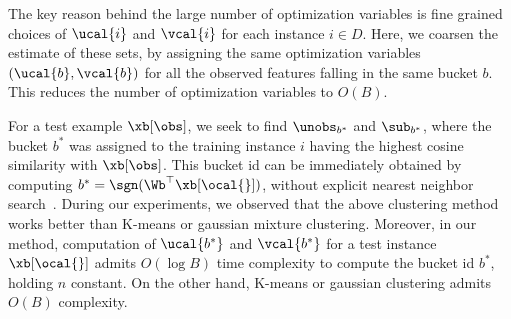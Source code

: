 \documentclass[letterpaper]{article}
\renewcommand{\cite}{\citep}
\begin{document}
The key reason behind the large number of optimization variables is   fine grained choices of $\ucal{i}$ and $\vcal{i}$ for each instance $i\in D$.
Here, we coarsen the estimate of these sets, by assigning the same optimization variables $(\ucal{b},\vcal{b})$ for all the observed features falling in the same bucket $b$. This reduces the number of optimization variables to $O(B)$.


For a test example $\xb[\obs]$, we seek to find $\unobs_{b^*}$ and $\sub_{b^*}$, where the bucket $b^*$ was assigned to the training instance $i$ having the highest cosine similarity with $\xb[\obs]$. This bucket id can be immediately obtained by computing $b^* = \sgn(\Wb^\top \xb[\ocal{}])$, without explicit nearest neighbor search~\cite{charikar2002similarity}.
During our experiments, we observed that the above clustering method works better than K-means or gaussian mixture clustering. Moreover, in our method, computation of $\ucal{b^*}$ and $\vcal{b^*}$ for a test instance $\xb[\ocal{}]$ admits $O(\log B )$ time complexity to compute the bucket id $b^*$, holding $n$ constant. On the other hand, K-means or gaussian clustering admits $O(B)$ complexity.





\end{document}
